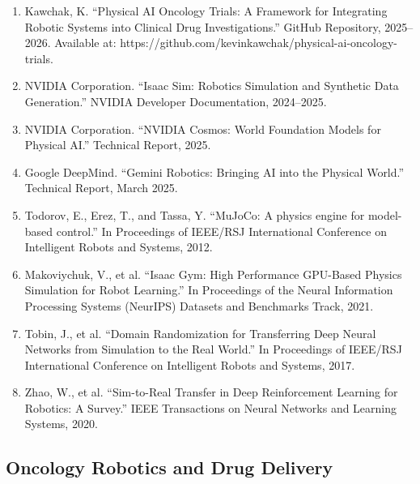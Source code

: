 \begin{enumerate}[resume]
\item Kawchak, K. ``Physical AI Oncology Trials: A Framework for Integrating Robotic Systems into Clinical Drug Investigations.'' GitHub Repository, 2025--2026. Available at: https://github.com/kevinkawchak/physical-ai-oncology-trials.

\item NVIDIA Corporation. ``Isaac Sim: Robotics Simulation and Synthetic Data Generation.'' NVIDIA Developer Documentation, 2024--2025.

\item NVIDIA Corporation. ``NVIDIA Cosmos: World Foundation Models for Physical AI.'' Technical Report, 2025.

\item Google DeepMind. ``Gemini Robotics: Bringing AI into the Physical World.'' Technical Report, March 2025.

\item Todorov, E., Erez, T., and Tassa, Y. ``MuJoCo: A physics engine for model-based control.'' In Proceedings of IEEE/RSJ International Conference on Intelligent Robots and Systems, 2012.

\item Makoviychuk, V., et al. ``Isaac Gym: High Performance GPU-Based Physics Simulation for Robot Learning.'' In Proceedings of the Neural Information Processing Systems (NeurIPS) Datasets and Benchmarks Track, 2021.

\item Tobin, J., et al. ``Domain Randomization for Transferring Deep Neural Networks from Simulation to the Real World.'' In Proceedings of IEEE/RSJ International Conference on Intelligent Robots and Systems, 2017.

\item Zhao, W., et al. ``Sim-to-Real Transfer in Deep Reinforcement Learning for Robotics: A Survey.'' IEEE Transactions on Neural Networks and Learning Systems, 2020.
\end{enumerate}

\subsection*{Oncology Robotics and Drug Delivery}

